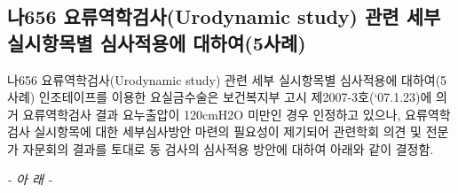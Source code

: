 \subsection{나656 요류역학검사(Urodynamic study) 관련 세부 실시항목별 심사적용에 대하여(5사례)}
나656 요류역학검사(Urodynamic study) 관련 세부 실시항목별 심사적용에 대하여(5사례)
인조테이프를 이용한 요실금수술은 보건복지부 고시 제2007-3호(‘07.1.23)에 의거 요류역학검사 결과 요누출압이 120cmH2O 미만인 경우 인정하고 있으나, 요류역학검사 실시항목에 대한 세부심사방안 마련의 필요성이 제기되어 관련학회 의견 및 전문가 자문회의 결과를 토대로 동 검사의 심사적용 방안에 대하여 아래와 같이 결정함.\par
\par 
\begin{center}\emph{- 아 래 -}\end{center}
 \par
